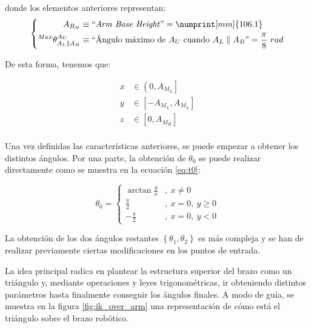 \begin{itemize}
          donde los elementos anteriores representan:
          \begin{equation*}
              \left\{\begin{aligned}
                  A_{B_H}                                & \equiv \text{``\textit{Arm Base Height}''} = \numprint[mm]{106.1}                       \\
                  ^{Max}\theta^{A_U}_{A_L \parallel A_B} & \equiv \text{``Ángulo máximo de $A_U$ cuando $A_L \parallel A_B$''} = \frac{\pi}{8}~rad \\
              \end{aligned}
              \right.
          \end{equation*}
\end{itemize}

De esta forma, tenemos que:

\begin{align*}
    x & \in \left(0, A_{M_L}\right]        \\
    y & \in \left[-A_{M_L}, A_{M_L}\right] \\
    z & \in \left[0, A_{M_H}\right]        \\
\end{align*}

Una vez definidas las características anteriores, se puede empezar a obtener los distintos
ángulos. Por una parte, la obtención de $\theta_0$ se puede realizar directamente como
se muestra en la ecuación \ref{eq:t0}:

\begin{equation}\label{eq:t0}
    \theta_0 = \left\{\begin{aligned}
        \arctan{\frac{y}{x}} & ,~x \neq 0        \\
        \frac{\pi}{2}        & ,~x = 0,~y \geq 0 \\
        -\frac{\pi}{2}       & ,~x = 0,~y < 0
    \end{aligned}\right.
\end{equation}

La obtención de los dos ángulos restantes $\left\{\theta_1, \theta_2\right\}$ es más
compleja y se han de realizar previamente ciertas modificaciones en los puntos de entrada.

La idea principal radica en plantear la estructura superior del brazo como un triángulo
y, mediante operaciones y leyes trigonométricas, ir obteniendo distintos parámetros hasta
finalmente conseguir los ángulos finales. A modo de guía, se muestra en la figura
\ref{fig:ik_over_arm} una representación de cómo está el triángulo sobre el brazo
robótico.

